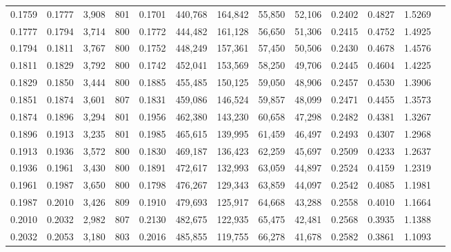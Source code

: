 \begin{tabular}{rrrrrrrrrrrrr}
0.1759 & 0.1777 &  3,908 & 801 &                                     0.1701 & 440,768 & 164,842 &  55,850 &  52,106 & 0.2402 & 0.4827 & 1.5269 \\
0.1777 & 0.1794 &  3,714 & 800 &                                     0.1772 & 444,482 & 161,128 &  56,650 &  51,306 & 0.2415 & 0.4752 & 1.4925 \\
0.1794 & 0.1811 &  3,767 & 800 &                                     0.1752 & 448,249 & 157,361 &  57,450 &  50,506 & 0.2430 & 0.4678 & 1.4576 \\
0.1811 & 0.1829 &  3,792 & 800 &                                     0.1742 & 452,041 & 153,569 &  58,250 &  49,706 & 0.2445 & 0.4604 & 1.4225 \\
0.1829 & 0.1850 &  3,444 & 800 &                                     0.1885 & 455,485 & 150,125 &  59,050 &  48,906 & 0.2457 & 0.4530 & 1.3906 \\
0.1851 & 0.1874 &  3,601 & 807 &                                     0.1831 & 459,086 & 146,524 &  59,857 &  48,099 & 0.2471 & 0.4455 & 1.3573 \\
0.1874 & 0.1896 &  3,294 & 801 &                                     0.1956 & 462,380 & 143,230 &  60,658 &  47,298 & 0.2482 & 0.4381 & 1.3267 \\
0.1896 & 0.1913 &  3,235 & 801 &                                     0.1985 & 465,615 & 139,995 &  61,459 &  46,497 & 0.2493 & 0.4307 & 1.2968 \\
0.1913 & 0.1936 &  3,572 & 800 &                                     0.1830 & 469,187 & 136,423 &  62,259 &  45,697 & 0.2509 & 0.4233 & 1.2637 \\
0.1936 & 0.1961 &  3,430 & 800 &                                     0.1891 & 472,617 & 132,993 &  63,059 &  44,897 & 0.2524 & 0.4159 & 1.2319 \\
0.1961 & 0.1987 &  3,650 & 800 &                                     0.1798 & 476,267 & 129,343 &  63,859 &  44,097 & 0.2542 & 0.4085 & 1.1981 \\
0.1987 & 0.2010 &  3,426 & 809 &                                     0.1910 & 479,693 & 125,917 &  64,668 &  43,288 & 0.2558 & 0.4010 & 1.1664 \\
0.2010 & 0.2032 &  2,982 & 807 &                                     0.2130 & 482,675 & 122,935 &  65,475 &  42,481 & 0.2568 & 0.3935 & 1.1388 \\
0.2032 & 0.2053 &  3,180 & 803 &                                     0.2016 & 485,855 & 119,755 &  66,278 &  41,678 & 0.2582 & 0.3861 & 1.1093 \\

\end{tabular}
